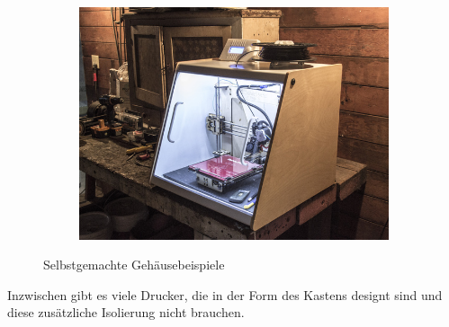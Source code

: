 \documentclass[11pt,a4paper]{article}
\begin{document}
\begin{figure}[H]
\begin{subfigure}[b]{0.3\textwidth}
    \end{subfigure}
    \quad %
    \begin{subfigure}[b]{0.3\textwidth}
        \includegraphics[width=\textwidth,cfbox=azul_marcos 4pt 0pt]{FOTOS/CERRAMIENTO3}
    \end{subfigure}
    \caption*{Selbstgemachte Gehäusebeispiele}
\end{figure}
Inzwischen gibt es viele Drucker, die in der Form des Kastens designt sind und diese zusätzliche Isolierung nicht brauchen.
\end{document}
